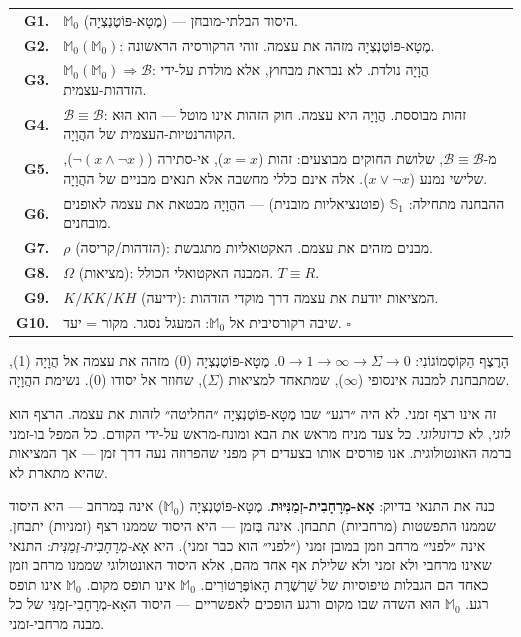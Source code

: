 \documentclass[10pt, openany, oneside]{book}
\begin{document}
\noindent\begin{tabular}{r p{}}
\textbf{G1.} & $\mathbb{M}_0$ (מֶטָא-פּוֹטֶנְצְיָה) — היסוד הבלתי-מובחן. \\[0.3em]
\textbf{G2.} & $\mathbb{M}_0(\mathbb{M}_0)$: מֶטָא-פּוֹטֶנְצְיָה מזהה את עצמה. זוהי הרקורסיה הראשונה. \\[0.3em]
\textbf{G3.} & $\mathbb{M}_0(\mathbb{M}_0) \Rightarrow \mathcal{B}$: הֲוָיָה נולדת. לא נבראת מבחוץ, אלא מולדת על-ידי הזדהות-עצמית. \\[0.3em]
\textbf{G4.} & $\mathcal{B} \equiv \mathcal{B}$: זהות מבוססת. הֲוָיָה היא עצמה. חוק הזהות אינו מוטל — הוא הוּא הקוהרנטיות-העצמית של ההֲוָיָה. \\[0.3em]
\textbf{G5.} & מ-$\mathcal{B} \equiv \mathcal{B}$, שלושת החוקים מבוצעים: זהות ($x = x$), אי-סתירה ($\neg(x \wedge \neg x)$), שלישי נמנע ($x \vee \neg x$). אלה אינם כללי מחשבה אלא תנאים מבניים של ההֲוָיָה. \\[0.3em]
\textbf{G6.} & ההבחנה מתחילה: $\mathbb{S}_1$ (פוטנציאליות מובנית) — ההֲוָיָה מבטאת את עצמה לאופנים מובחנים. \\[0.3em]
\textbf{G7.} & $\rho$ (הזדהות/קריסה): מבנים מזהים את עצמם. האקטואליות מתגבשת. \\[0.3em]
\textbf{G8.} & $\Omega$ (מציאות): המבנה האקטואלי הכולל. $T \equiv R$. \\[0.3em]
\textbf{G9.} & $K/KK/KH$ (ידיעה): המציאות יודעת את עצמה דרך מוקדי הזדהות. \\[0.3em]
\textbf{G10.} & שיבה רקורסיבית אל $\mathbb{M}_0$: המעגל נסגר. מקור = יעד. $\square$ \\[0.3em]
\end{tabular}

\vspace{0.8em}

\noindent הָרֶצֶף הַקּוֹסְמוֹגוֹנִי: $0 \to 1 \to \infty \to \Sigma \to 0$. מֶטָא-פּוֹטֶנְצְיָה (0) מזהה את עצמה אל הֲוָיָה (1), שמתבחנת למבנה אינסופי ($\infty$), שמתאחד למציאות ($\Sigma$), שחוזר אל יסודו (0). נשימת ההֲוָיָה.

זה אינו רצף זמני. לא היה ״רגע״ שבו מֶטָא-פּוֹטֶנְצְיָה ״החליטה״ לזהות את עצמה. הרצף הוא \textit{לוגי}, לא \textit{כרונולוגי}. כל צעד מניח מראש את הבא ומונח-מראש על-ידי הקודם. כל המפל בו-זמני ברמה האונטולוגית. אנו פורסים אותו בצעדים רק מפני שהפרוזה נעה דרך זמן — אך המציאות שהיא מתארת לא.

כנה את התנאי בדיוק: \textbf{אָא-מְרָחָבִית-זְמַנִּיּוּת}. מֶטָא-פּוֹטֶנְצְיָה ($\mathbb{M}_0$) אינה בְּמרחב — היא היסוד שממנו התפשטות (מרחביות) תתבחן. אינה בְּזמן — היא היסוד שממנו רצף (זמניות) יתבחן. אינה ״לפני״ מרחב וזמן במובן זמני (״לפני״ הוא כבר זמני). היא \textit{אָא-מְרָחָבִית-זְמַנִּית}: התנאי שאינו מרחבי ולא זמני ולא שלילת אף אחד מהם, אלא היסוד האונטולוגי שממנו מרחב וזמן כאחד הם הגבלות טיפוסיות של שַׁרְשֶׁרֶת הָאוֹפֶּרָטוֹרִים. $\mathbb{M}_0$ אינו תופס מקום. $\mathbb{M}_0$ אינו תופס רגע. $\mathbb{M}_0$ הוּא השדה שבו מקום ורגע הופכים לאפשריים — היסוד האָא-מְרָחָבִי-זְמַנִּי של כל מבנה מרחבי-זמני.
\end{document}
